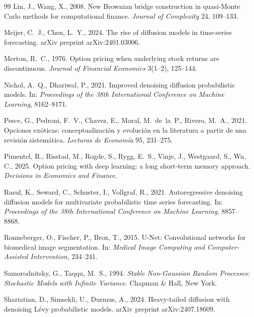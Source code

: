 \documentclass[12pt,letterpaper]{article}
\begin{document}
\begin{thebibliography}{99}
Lin, J., Wang, X., 2008. New Brownian bridge construction in quasi-Monte
Carlo methods for computational finance. \emph{Journal of Complexity} 24,
109--133.

Meijer, C.~J., Chen, L.~Y., 2024. The rise of diffusion models in
time-series forecasting. arXiv preprint arXiv:2401.03006.

Merton, R.~C., 1976. Option pricing when underlying stock returns are
discontinuous. \emph{Journal of Financial Economics} 3(1--2), 125--144.

Nichol, A.~Q., Dhariwal, P., 2021. Improved denoising diffusion
probabilistic models. In: \emph{Proceedings of the 38th International
Conference on Machine Learning}, 8162--8171.

Pesce, G., Pedroni, F.~V., Chavez, E., Moral, M.~de~la~P., Rivero, M.~A.,
2021. Opciones ex\'oticas: conceptualizaci\'on y evoluci\'on en la
literatura a partir de una revisi\'on sistem\'atica. \emph{Lecturas de
Econom\'ia} 95, 231--275.

Pimentel, R., Risstad, M., Rogde, S., Rygg, E.~S., Vinje, J., Westgaard,
S., Wu, C., 2025. Option pricing with deep learning: a long short-term
memory approach. \emph{Decisions in Economics and Finance}.

Rasul, K., Seward, C., Schuster, I., Vollgraf, R., 2021. Autoregressive
denoising diffusion models for multivariate probabilistic time series
forecasting. In: \emph{Proceedings of the 38th International Conference on
Machine Learning}, 8857--8868.

Ronneberger, O., Fischer, P., Brox, T., 2015. U-Net: Convolutional networks
for biomedical image segmentation. In: \emph{Medical Image Computing and
Computer-Assisted Intervention}, 234--241.

Samorodnitsky, G., Taqqu, M.~S., 1994. \emph{Stable Non-Gaussian Random
Processes: Stochastic Models with Infinite Variance}. Chapman \& Hall, New
York.

Shariatian, D., Simsekli, U., Durmus, A., 2024. Heavy-tailed diffusion with
denoising L\'evy probabilistic models. arXiv preprint arXiv:2407.18609.


\end{thebibliography}
\end{document}
